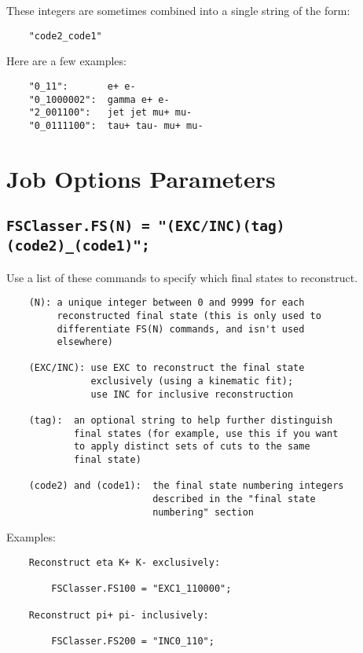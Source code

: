 \documentclass[11pt,a4paper]{define/cepcnote}
\begin{document}
These integers are sometimes combined into a single string of the form:

\begin{verbatim}
    "code2_code1"
\end{verbatim}

Here are a few examples:

\begin{verbatim}
    "0_11":       e+ e-         
    "0_1000002":  gamma e+ e-   
    "2_001100":   jet jet mu+ mu-
    "0_0111100":  tau+ tau- mu+ mu-
\end{verbatim}

\section{Job Options Parameters}
\label{sec:parameters}

\subsection{\tt FSClasser.FS(N) = "(EXC/INC)(tag)(code2)\_(code1)";}
\label{sec:fsn}

Use a list of these commands to specify which final states to reconstruct.
\begin{verbatim}
    (N): a unique integer between 0 and 9999 for each 
         reconstructed final state (this is only used to 
         differentiate FS(N) commands, and isn't used
         elsewhere)

    (EXC/INC): use EXC to reconstruct the final state 
               exclusively (using a kinematic fit);
               use INC for inclusive reconstruction

    (tag):  an optional string to help further distinguish
            final states (for example, use this if you want
            to apply distinct sets of cuts to the same
            final state)

    (code2) and (code1):  the final state numbering integers 
                          described in the "final state 
                          numbering" section
\end{verbatim}
Examples:
\begin{verbatim}
    Reconstruct eta K+ K- exclusively:

        FSClasser.FS100 = "EXC1_110000";

    Reconstruct pi+ pi- inclusively:

        FSClasser.FS200 = "INC0_110";
\end{verbatim}
\end{document}
